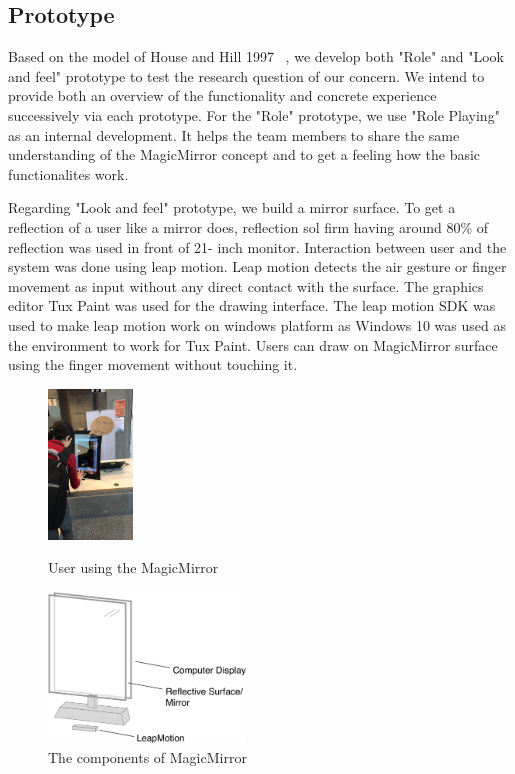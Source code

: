 \documentclass{sigchi-ext}
\begin{document}
\subsection{Prototype}
Based on the model of House and Hill 1997 ~\cite{houdeChapter16What1997}, we develop both "Role" and "Look and feel" prototype to test the research question of our concern. We intend to provide both an overview of the functionality and concrete experience successively via each prototype.
For the "Role" prototype, we use "Role Playing" as an internal development. It helps the team members to share the same understanding of the MagicMirror concept and to get a feeling how the basic functionalites work.

Regarding "Look and feel" prototype, we build a mirror surface. To get a reflection of a user like a mirror does, reflection sol firm having around 80\% of reflection was used in front of 21- inch monitor. Interaction between user and the system was done using leap motion. Leap motion detects the air gesture or finger movement as input without any direct contact with the surface. The graphics editor Tux Paint was used for the drawing interface. The leap motion SDK was used to make leap motion work on windows platform as Windows 10 was used as the environment to work for Tux Paint. Users can draw on MagicMirror surface using the finger movement without touching it.
\begin{figure}[h]
	\center
  	\includegraphics[height=4cm, scale=0.2]{images/prototype}
	\caption{User using the MagicMirror}
	\center
  	\includegraphics[height=4cm, scale=0.5]{images/cartoon}
  	\caption{The components of MagicMirror}
  
\end{figure}
\end{document}
